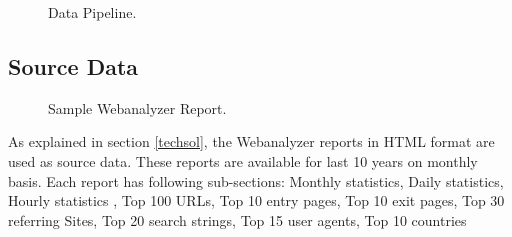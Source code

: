 \begin{figure}
\centering
{}
\caption{Data Pipeline.}
\label{fig:datapipeline}
\end{figure}


\subsection{Source Data} \label{sourcedata}
\begin{figure}
\centering
{}
\caption{Sample Webanalyzer Report.}
\label{fig:samplewebanalyzer}
\end{figure}

As explained in section \ref{techsol}, the Webanalyzer reports in HTML format
are used as source data. These reports are available for last 10 years on
monthly basis. Each report has following sub-sections:
Monthly statistics, Daily statistics, Hourly statistics
, Top 100 URLs, Top 10 entry pages, Top 10 exit pages, Top 30 referring Sites, Top 20 search strings, Top 15 user agents, Top 10 countries

